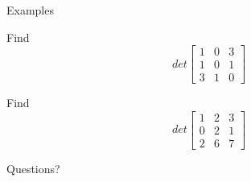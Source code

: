 \documentclass{beamer}
\begin{document}
\begin{frame}{Examples}
  \begin{example}
    Find
    \begin{equation*}
      det \left[
	\begin{array}{ccc}
          1&0&3\\
          1&0&1\\
          3&1&0               
	\end{array}
      \right]
    \end{equation*}
  \end{example}
    \begin{example}
    Find
    \begin{equation*}
      det \left[
	\begin{array}{ccc}
          1&2&3\\
          0&2&1\\
          2&6&7               
	\end{array}
      \right]
    \end{equation*}
  \end{example}
\end{frame}

\begin{frame}
  Questions?
\end{frame}
\end{document}
